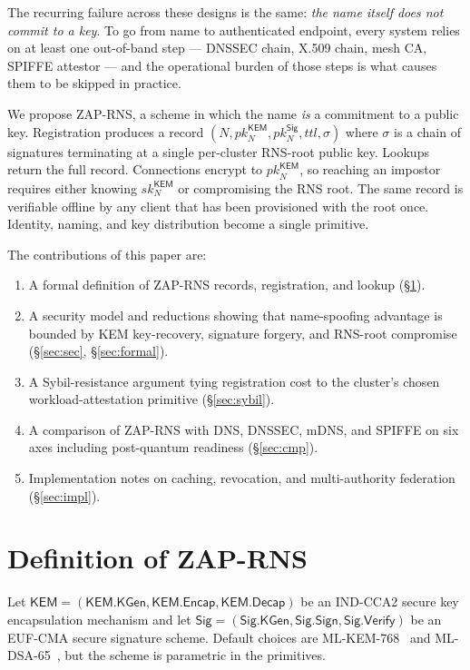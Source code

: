 \documentclass[11pt,a4paper]{article}
\theoremstyle{definition}
\theoremstyle{remark}
\newcommand{\KEM}{\mathsf{KEM}}
\newcommand{\Sig}{\mathsf{Sig}}
\newcommand{\KGen}{\mathsf{KGen}}
\newcommand{\Encap}{\mathsf{Encap}}
\newcommand{\Decap}{\mathsf{Decap}}
\newcommand{\Sign}{\mathsf{Sign}}
\newcommand{\Verify}{\mathsf{Verify}}
\newcommand{\pk}{\mathit{pk}}
\newcommand{\sk}{\mathit{sk}}
\newcommand{\RNS}{\textsc{ZAP-RNS}}
\begin{document}
The recurring failure across these designs is the same: \emph{the name
itself does not commit to a key}. To go from name to authenticated
endpoint, every system relies on at least one out-of-band step ---
DNSSEC chain, X.509 chain, mesh CA, SPIFFE attestor --- and the
operational burden of those steps is what causes them to be skipped
in practice.

We propose \RNS, a scheme in which the name \emph{is} a commitment to a
public key. Registration produces a record
$(N, \pk_N^\KEM, \pk_N^\Sig, \mathit{ttl}, \sigma)$ where $\sigma$ is a
chain of signatures terminating at a single per-cluster RNS-root
public key. Lookups return the full record. Connections encrypt to
$\pk_N^\KEM$, so reaching an impostor requires either knowing
$\sk_N^\KEM$ or compromising the RNS root. The same record is
verifiable offline by any client that has been provisioned with the
root once. Identity, naming, and key distribution become a single
primitive.

The contributions of this paper are:
\begin{enumerate}[label=(\arabic*),leftmargin=*]
\item A formal definition of \RNS{} records, registration, and lookup
(\S\ref{sec:def}).
\item A security model and reductions showing that name-spoofing
advantage is bounded by KEM key-recovery, signature forgery, and
RNS-root compromise (\S\ref{sec:sec}, \S\ref{sec:formal}).
\item A Sybil-resistance argument tying registration cost to the
cluster's chosen workload-attestation primitive (\S\ref{sec:sybil}).
\item A comparison of \RNS{} with DNS, DNSSEC, mDNS, and SPIFFE on
six axes including post-quantum readiness (\S\ref{sec:cmp}).
\item Implementation notes on caching, revocation, and multi-authority
federation (\S\ref{sec:impl}).
\end{enumerate}

\section{Definition of \RNS}\label{sec:def}

Let $\KEM = (\KEM.\KGen, \KEM.\Encap, \KEM.\Decap)$ be an IND-CCA2 secure
key encapsulation mechanism and let $\Sig = (\Sig.\KGen, \Sig.\Sign,
\Sig.\Verify)$ be an EUF-CMA secure signature scheme. Default choices
are ML-KEM-768~\cite{mlkem} and ML-DSA-65~\cite{mldsa}, but the scheme
is parametric in the primitives.
\end{document}
